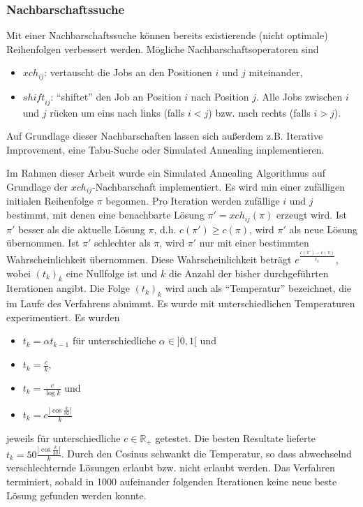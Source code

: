 \documentclass{scrreprt}
\begin{document}
\subsubsection{Nachbarschaftssuche}
Mit einer Nachbarschaftssuche können bereits existierende (nicht optimale) Reihenfolgen verbessert werden.
Mögliche Nachbarschaftsoperatoren sind
\begin{itemize}
    \item $\mathit{xch}_{ij}$: vertauscht die Jobs an den Positionen $i$ und $j$ miteinander,
    \item $\mathit{shift}_{ij}$: "`shiftet"' den Job an Position $i$ nach Position $j$. 
        Alle Jobs zwischen $i$ und $j$ rücken um eins nach links (falls $i<j$) bzw. nach rechts (falls $i>j$).
\end{itemize}
Auf Grundlage dieser Nachbarschaften lassen sich außerdem z.B. Iterative Improvement, eine Tabu-Suche oder Simulated Annealing implementieren.

Im Rahmen dieser Arbeit wurde ein Simulated Annealing Algorithmus auf Grundlage der $\mathit{xch}_{ij}$-Nachbarschaft implementiert.
Es wird min einer zufälligen initialen Reihenfolge $\pi$ begonnen.
Pro Iteration werden zufällige $i$ und $j$ bestimmt, mit denen eine benachbarte Lösung $\pi' = \mathit{xch}_{ij}(\pi)$ erzeugt wird.
Ist $\pi'$ besser als die aktuelle Lösung $\pi$, d.h. $c(\pi')\geq c(\pi)$, wird $\pi'$ als neue Lösung übernommen.
Ist $\pi'$ schlechter als $\pi$, wird $\pi'$ nur mit einer bestimmten Wahrscheinlichkeit übernommen.
Diese Wahrscheinlichkeit beträgt $e^{\frac{c(\pi')-c(\pi)}{t_k}}$, wobei $(t_k)_k$ eine Nullfolge ist 
und $k$ die Anzahl der bisher durchgeführten Iterationen angibt.
Die Folge $(t_k)_k$ wird auch als "`Temperatur"' bezeichnet, die im Laufe des Verfahrens abnimmt.
Es wurde mit unterschiedlichen Temperaturen experimentiert.
Es wurden 
\begin{itemize}
    \item $t_k = \alpha t_{k-1}$ für unterschiedliche $\alpha\in]0,1[$ und 
    \item $t_k = \frac{c}{k}$, 
    \item $t_k = \frac{c}{\log k}$ und 
    \item $t_k = c \frac{|\cos\frac{k}{30}|}{k}$
\end{itemize}
jeweils für unterschiedliche $c\in\mathbb{R}_+$ getestet. Die besten Resultate lieferte $t_k = 50\frac{|\cos\frac{k}{30}|}{k}$.
Durch den Cosinus schwankt die Temperatur, so dass abwechselnd verschlechternde Lösungen erlaubt bzw. nicht erlaubt werden.
Das Verfahren terminiert, sobald in 1000 aufeinander folgenden Iterationen keine neue beste Lösung gefunden werden konnte.
\end{document}
